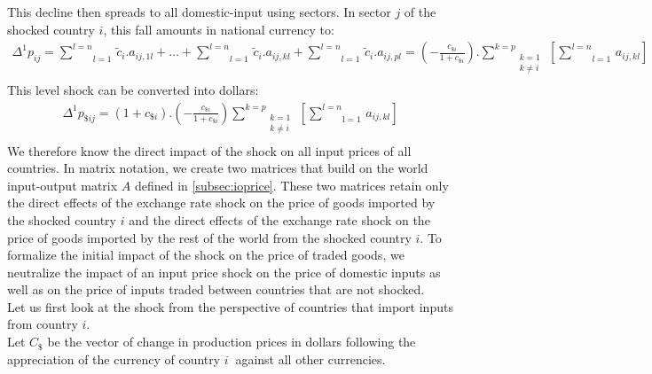 \documentclass[11pt,a4paper]{article}
\begin{document}
This decline then spreads to all domestic-input using sectors. In sector $j$ of the shocked country $i$, this fall amounts in national currency to: \\
\begin{eqnarray*}
\Delta^1p_{ij}=\underset{l=1}{\overset{l=n}{\mathop \sum}}\,{\tilde{c}_{i}}.a_{ij,1l}+\ldots +\underset{l=1}{\overset{{l}=n}{\mathop \sum }}\,{{\tilde{c}}_i}.a_{ij,kl}+\underset{l=1}{\overset{l={n}}{\mathop \sum }}\,{{{\tilde{c}}}_{i}}.{{a}_{ij,pl}}=\left( -\frac{{{c}_{\$i}}}{1+c_{\$i}}\right).\underset{\begin{matrix}k=1\\k\neq i\\\end{matrix}}{\overset{{k}={p}}{\mathop\sum}}\,\left[\underset{l=1}{\overset{l=n}{\mathop\sum}}\,a_{ij,kl}\right] 
\end{eqnarray*}
This level shock can be converted into dollars: \\
\begin{eqnarray}
{{\Delta }^{1}}{{{p}}_{\$ij}}=\left(1+{{c}_{\$i}}\right).\left(-\frac{{{{c}}_{\$i}}}{1+{{{c}}_{\$i}}}\right)\underset{\begin{matrix}k=1\\k\neq i\\\end{matrix}}{\overset{{k}={p}}{\mathop\sum}}\,\left[\underset{\text{l}=1}{\overset{{l}={n}}{\mathop\sum}}\,{{{a}}_{ij,kl}}\right] 
\label{eq:eq2}
\end{eqnarray}
We therefore know the direct impact of the shock on all input prices of all countries.
In matrix notation, we create two matrices that build on the world input-output matrix $A$ defined in \ref{subsec:ioprice}. These two matrices retain only the direct effects of the exchange rate shock on the price of goods imported by the shocked country $i$ and the direct effects of the exchange rate shock on the price of goods imported by the rest of the world from the shocked country $i$. To formalize the initial impact of the shock on the price of traded goods, we neutralize the impact of an input price shock on the price of domestic inputs as well as on the price of inputs traded between countries that are not shocked.\\
Let us first look at the shock from the perspective of countries that import inputs from country $i$.\\
Let ${C_{\$}}$ be the vector of change in production prices in dollars following the 
appreciation of the currency of country $i~$ against all other currencies.
\end{document}
